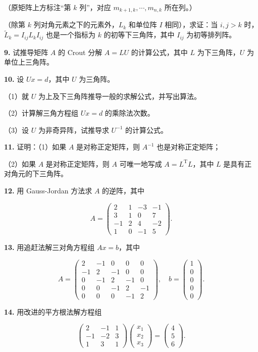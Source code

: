 \documentclass[
  10pt,
  fontset=fandol]{ctexart}
\begin{document}
（原矩阵上方标注``第 \(k\) 列''，对应 \(m_{k+1,k},\cdots,m_{n,k}\) 所在列。）

（除第 \(k\) 列对角元素之下的元素外，\(L_k\) 和单位阵 \(I\) 相同），求证：当 \(i,j>k\) 时，\(\widetilde L_k=I_{ij}L_kI_{ij}\) 也是一个指标为 \(k\) 的初等下三角阵，其中 \(I_{ij}\) 为初等排列阵。

\textbf{9.} 试推导矩阵 \(A\) 的 Crout 分解 \(A=LU\) 的计算公式，其中 \(L\) 为下三角阵，\(U\) 为单位上三角阵。

\textbf{10.} 设 \(Ux=d\)，其中 \(U\) 为三角阵。

（1）就 \(U\) 为上及下三角阵推导一般的求解公式，并写出算法。

（2）计算解三角方程组 \(Ux=d\) 的乘除法次数。

（3）设 \(U\) 为非奇异阵，试推导求 \(U^{-1}\) 的计算公式。

\textbf{11.} 证明：（1）如果 \(A\) 是对称正定矩阵，则 \(A^{-1}\) 也是对称正定矩阵；

（2）如果 \(A\) 是对称正定矩阵，则 \(A\) 可唯一地写成 \(A=L^{\mathrm T}L\)，其中 \(L\) 是具有正对角元的下三角阵。

\textbf{12.} 用 Gauss-Jordan 方法求 \(A\) 的逆阵，其中

\[
A=\begin{pmatrix}
2&1&-3&-1\\
3&1&0&7\\
-1&2&4&-2\\
1&0&-1&5
\end{pmatrix}.
\]

\textbf{13.} 用追赶法解三对角方程组 \(Ax=b\)，其中

\[
A=\begin{pmatrix}
2&-1&0&0&0\\
-1&2&-1&0&0\\
0&-1&2&-1&0\\
0&0&-1&2&-1\\
0&0&0&-1&2
\end{pmatrix},\quad
b=\begin{pmatrix}1\\0\\0\\0\\0\end{pmatrix}.
\]

\textbf{14.} 用改进的平方根法解方程组

\[
\begin{pmatrix}
2&-1&1\\
-1&-2&3\\
1&3&1
\end{pmatrix}
\begin{pmatrix}x_1\\x_2\\x_3\end{pmatrix}
=\begin{pmatrix}4\\5\\6\end{pmatrix}.
\]
\end{document}

